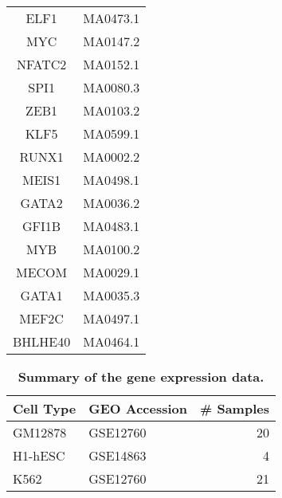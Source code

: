 \begin{supertabular}{cc}
ELF1 & MA0473.1\\
MYC & MA0147.2\\
NFATC2 & MA0152.1\\
SPI1 & MA0080.3\\
ZEB1 & MA0103.2\\
KLF5 & MA0599.1\\
RUNX1 & MA0002.2\\
MEIS1 & MA0498.1\\
GATA2 & MA0036.2\\
GFI1B & MA0483.1\\
MYB & MA0100.2\\
MECOM & MA0029.1\\
GATA1 & MA0035.3\\
MEF2C & MA0497.1\\
BHLHE40 & MA0464.1\\
        \hline
\end{supertabular}

\onecolumn

\clearpage

\begin{table}[t]
\begin{center}
\caption[Summary of the gene expression data]{\textbf{Summary of the gene expression data.}}
\label{tab:data.expression}
    \renewcommand{\arraystretch}{1.2}
    \begin{tabular}{ llr }
        \hline
        Cell Type & GEO Accession & \# Samples \\
        \hline
        GM12878   & GSE12760 & 20 \\
        H1-hESC   & GSE14863 & 4  \\
        K562      & GSE12760 & 21 \\
        \hline
    \end{tabular}
\end{center}
\end{table}

\clearpage





